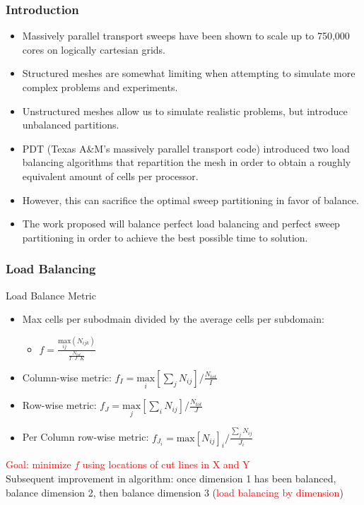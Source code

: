 \documentclass[xcolor={usenames,dvipsnames,svgnames,table}]{beamer}
\newcommand{\tcr}[1]{\textcolor{red}{#1}}
\begin{document}
\begin{frame}[t]\frametitle{Introduction}
\begin{block}{}
\begin{itemize}
	\item Massively parallel transport sweeps have been shown to scale up to 750,000 cores on logically cartesian grids.
	\item Structured meshes are somewhat limiting when attempting to simulate more complex problems and experiments.
	\item Unstructured meshes allow us to simulate realistic problems, but introduce unbalanced partitions. 
	\item PDT (Texas A\&M's massively parallel transport code) introduced two load balancing algorithms that repartition the mesh in order to obtain a roughly equivalent amount of cells per processor. 
	\item However, this can sacrifice the optimal sweep partitioning in favor of balance. 
	\item The work proposed will balance perfect load balancing and perfect sweep partitioning in order to achieve the best possible time to solution.
\end{itemize}
\end{block}
\end{frame}

\begin{frame}[t]\frametitle{Load Balancing}
\begin{block}{Load Balance Metric}
  \begin{itemize}
    \item Max cells per subodmain divided by the average cells per subdomain:
      \begin{itemize}
        \item$f =\frac{\underset{ij}{\text{max}}(N_{ijk})}{\frac{N_{tot}}{I\cdot J\cdot K}}$
      \end{itemize}
    \item Column-wise metric: $f_I = \underset{i}{\text{max}}[\sum_{j} N_{ij}]/\frac{N_{tot}}{I}$
    \item Row-wise metric: $f_J = \underset{j}{\text{max}}[\sum_{i} N_{ij}]/\frac{N_{tot}}{J}$
    \item Per Column row-wise metric: $f_{J_i} = \text{max}[N_{ij}]_i/\frac{\sum_{j}N_{ij}}{J_i}$
  \end{itemize}		
  \tcr{Goal: minimize $f$ using locations of cut lines in X and Y}\\
    
  Subsequent improvement in algorithm: once dimension 1 has been balanced, balance dimension 2, then balance dimension 3 (\tcr{load balancing by dimension})
\end{block}
\end{frame}
\end{document}
